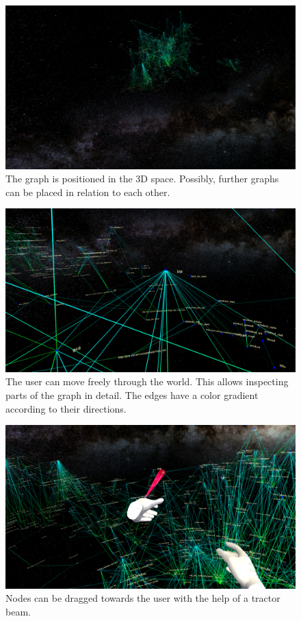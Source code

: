 \documentclass{llncs}
\begin{document}
\begin{figure}
    \centering
    \includegraphics[width=1\textwidth ]{galaxyfaraway}
    \caption{The graph is positioned in the 3D space. Possibly, further graphs can be placed in relation to each other.}
    \label{fig:sample_figure1}
\end{figure}

\begin{figure}
    \centering
    \includegraphics[width=1\textwidth ]{part}
    \caption{The user can move freely through the world. This allows inspecting parts of the graph in detail. The edges have a color gradient according to their directions.}
    \label{fig:sample_figure2}
\end{figure}


\begin{figure}
    \centering
    \includegraphics[width=1\textwidth ]{tractor}
    \caption{Nodes can be dragged towards the user with the help of a tractor beam.}
    \label{fig:sample_figure3}
\end{figure}
\end{document}
